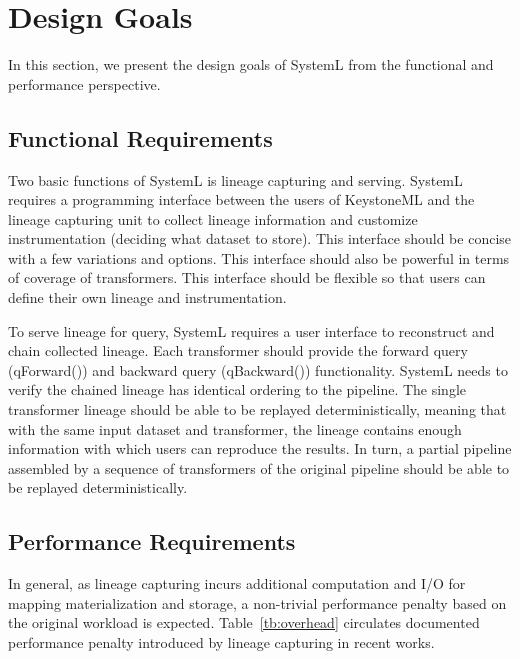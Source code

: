 \documentclass{sig-alternate}
\begin{document}
\section{Design Goals}
\label{sec:Req}
In this section, we present the design goals of SystemL from the functional and performance perspective.

\subsection{Functional Requirements}
Two basic functions of SystemL is lineage capturing and serving.
SystemL requires a programming interface between the users of KeystoneML and the lineage capturing unit to 
collect lineage information and customize instrumentation (deciding what dataset to store). 
This interface should be concise with a few variations and options.
This interface should also be powerful in terms of coverage of transformers.
This interface should be flexible so that users can define their own lineage and instrumentation.

To serve lineage for query, SystemL requires a user interface to reconstruct and chain collected lineage.
Each transformer should provide the forward query (qForward()) and backward query (qBackward()) functionality.
SystemL needs to verify the chained lineage has identical ordering to the pipeline.
The single transformer lineage should be able to be replayed deterministically, meaning that with the same input dataset and transformer,
the lineage contains enough information with which users can reproduce the results.
In turn, a partial pipeline assembled by a sequence of transformers of the original pipeline should be able to be replayed deterministically.

\subsection{Performance Requirements}
\label{sec:Req-Perf}
In general, as lineage capturing incurs additional computation and I/O for mapping materialization and storage, a non-trivial performance
penalty based on the original workload is expected. 
Table~\ref{tb:overhead} circulates documented performance penalty introduced by lineage capturing in recent works. 
\end{document}
